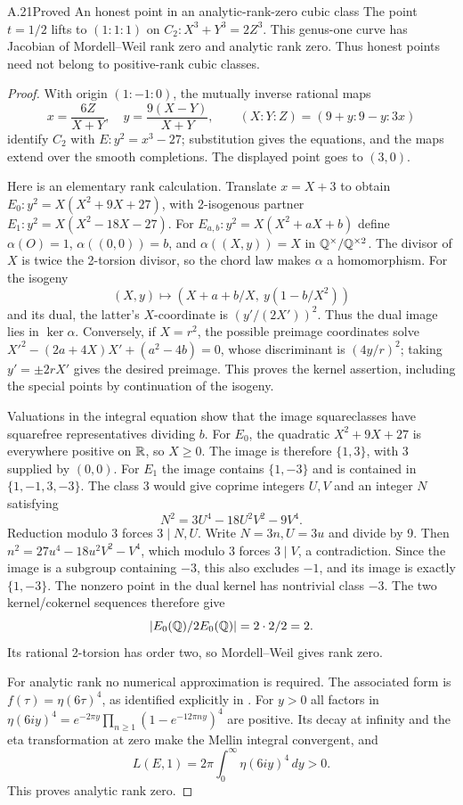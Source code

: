 \begin{statement}{A.21}{Proved}
{An honest point in an analytic-rank-zero cubic class}
The point $t=1/2$ lifts to $(1:1:1)$ on
$C_2:X^3+Y^3=2Z^3$.  This genus-one curve has Jacobian of
Mordell--Weil rank zero and analytic rank zero.  Thus honest points
need not belong to positive-rank cubic classes.
\end{statement}
\begin{proof}
With origin $(1:-1:0)$, the mutually inverse rational maps
\[
 x=\frac{6Z}{X+Y},\quad y=\frac{9(X-Y)}{X+Y},
 \qquad (X:Y:Z)=(9+y:9-y:3x)
\]
identify $C_2$ with $E:y^2=x^3-27$; substitution gives the equations,
and the maps extend over the smooth completions.  The displayed point
goes to $(3,0)$.

Here is an elementary rank calculation.  Translate $x=X+3$ to obtain
$E_0:y^2=X(X^2+9X+27)$, with 2-isogenous partner
$E_1:y^2=X(X^2-18X-27)$.  For $E_{a,b}:y^2=X(X^2+aX+b)$ define
$\alpha(O)=1$, $\alpha((0,0))=b$, and $\alpha((X,y))=X$ in
$\mathbb Q^\times/\mathbb Q^{\times2}$.  The divisor of $X$ is twice the
2-torsion divisor, so the chord law makes $\alpha$ a homomorphism.
For the isogeny
\[
 (X,y)\longmapsto
       (X+a+b/X,\ y(1-b/X^2))
\]
and its dual, the latter's $X$-coordinate is $(y'/(2X'))^2$.
Thus the dual image lies in $\ker\alpha$.  Conversely, if $X=r^2$,
the possible preimage coordinates solve
$X'^2-(2a+4X)X'+(a^2-4b)=0$, whose discriminant is
$(4y/r)^2$; taking $y'=\pm2rX'$ gives the desired preimage.
This proves the kernel assertion, including the special points by
continuation of the isogeny.

Valuations in the integral equation show that the image squareclasses
have squarefree representatives dividing $b$.  For $E_0$, the
quadratic $X^2+9X+27$ is everywhere positive on $\mathbb R$, so $X\ge0$.
The image is therefore $\{1,3\}$, with 3 supplied by $(0,0)$.
For $E_1$ the image contains $\{1,-3\}$ and is contained in
$\{1,-1,3,-3\}$.  The class 3 would give coprime integers $U,V$
and an integer $N$ satisfying
\[
                 N^2=3U^4-18U^2V^2-9V^4.
\]
Reduction modulo 3 forces $3\mid N,U$.  Write $N=3n,U=3u$ and
divide by 9.  Then
$n^2=27u^4-18u^2V^2-V^4$, which modulo 3 forces $3\mid V$,
a contradiction.  Since the image is a subgroup containing $-3$,
this also excludes $-1$, and its image is exactly $\{1,-3\}$.
The nonzero point in the dual kernel has nontrivial class $-3$.
The two kernel/cokernel sequences therefore give
\[
 |E_0(\mathbb Q)/2E_0(\mathbb Q)|=2\cdot2/2=2.
\]
Its rational 2-torsion has order two, so Mordell--Weil gives rank zero.

For analytic rank no numerical approximation is required.  The
associated form is $f(\tau)=\eta(6\tau)^4$, as identified explicitly
in \cite[Introduction and the $N=1$ case of the main theorem]{LegKanekoSakai2013}.
For $y>0$ all factors in
$\eta(6iy)^4=e^{-2\pi y}\prod_{n\ge1}(1-e^{-12\pi ny})^4$
are positive.  Its decay at infinity and the eta transformation at
zero make the Mellin integral convergent, and
\[
                     L(E,1)=2\pi\int_0^\infty\eta(6iy)^4\,dy>0.
\]
This proves analytic rank zero.
\end{proof}

